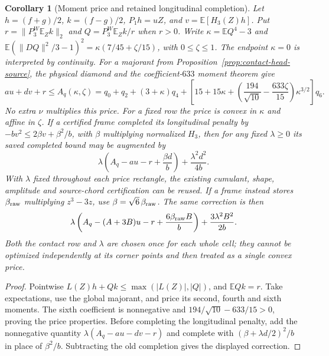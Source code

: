 \documentclass[11pt]{article}
\newcommand{\E}{\mathbb E}
\newtheorem{corollary}[theorem]{Corollary}
\begin{document}
\begin{corollary}[Moment price and retained longitudinal completion]
Let $h=(f+g)/2$, $k=(f-g)/2$, $P_1h=uZ$, and
$v=\mathbb E[H_3(Z)h]$.  Put
$r=\|P_3^W\mathbb E_Zk\|_2$ and
$Q=P_3^W\mathbb E_Zk/r$ when $r>0$.
Write $\kappa=\E Q^4-3$ and
$\E(\|DQ\|^2/3-1)^2=\kappa(7/45+\zeta/15)$, with $0\le\zeta\le1$.
The endpoint $\kappa=0$ is interpreted by continuity.
For a majorant from Proposition~\ref{prop:contact-head-source}, the physical
diamond and the coefficient-$633$ moment theorem give
\[
 au+dv+r\le A_q(\kappa,\zeta)
 =q_0+q_2+(3+\kappa)q_4+
 \left[15+15\kappa+
  \left(\frac{194}{\sqrt{10}}-\frac{633\zeta}{15}\right)\kappa^{3/2}\right]q_6.
\]
No extra $\nu$ multiplies this price.  For a fixed row the price is convex
in $\kappa$ and affine in $\zeta$.
If a certified frame completed its longitudinal penalty by
$-bv^2\le2\beta v+\beta^2/b$, with $\beta$ multiplying normalized $H_3$,
then for any fixed $\lambda\ge0$ its saved completed bound may be augmented by
\[
 \lambda\left(A_q-au-r+\frac{\beta d}{b}\right)
       +\frac{\lambda^2d^2}{4b}.
\]
With $\lambda$ fixed throughout each price rectangle, the existing cumulant,
shape, amplitude and source-chord certification can be reused.
If a frame instead stores $\beta_{\rm raw}$ multiplying $z^3-3z$, use
$\beta=\sqrt6\,\beta_{\rm raw}$.  The same correction is then
\[
 \lambda\left(A_q-(A+3B)u-r+\frac{6\beta_{\rm raw}B}{b}\right)
       +\frac{3\lambda^2B^2}{2b}.
\]
Both the contact row and $\lambda$ are chosen once for each whole cell;
they cannot be optimized independently at its corner points and then treated
as a single convex price.
\end{corollary}
\begin{proof}
Pointwise $L(Z)h+Qk\le\max(|L(Z)|,|Q|)$, and $\mathbb EQk=r$.
Take expectations, use the global majorant, and price its second, fourth and
sixth moments.  The sixth coefficient is nonnegative and
$194/\sqrt{10}-633/15>0$, proving the price properties.
Before completing the longitudinal penalty, add the nonnegative quantity
$\lambda(A_q-au-dv-r)$ and complete with
$(\beta+\lambda d/2)^2/b$ in place of $\beta^2/b$.
Subtracting the old completion gives the displayed correction.
\end{proof}
\end{document}
